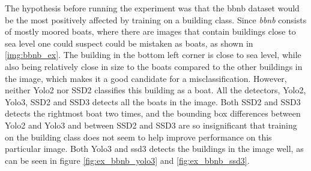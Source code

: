 The hypothesis before running the experiment was that the bbnb dataset would be the most positively affected by training on a building class. Since \textit{bbnb} consists of mostly moored boats, where there are images that contain buildings close to sea level one could suspect could be mistaken as boats, as shown in \ref{img:bbnb_ex}. The building in the bottom left corner is close to sea level, while also being relatively close in size to the boats compared to the other buildings in the image, which makes it a good candidate for a misclassification. However, neither Yolo2 nor SSD2 classifies this building as a boat. All the detectors, Yolo2, Yolo3, SSD2 and SSD3 detects all the boats in the image. Both SSD2 and SSD3 detects the rightmost boat two times, and the bounding box differences between Yolo2 and Yolo3 and between SSD2 and SSD3 are so insignificant that training on the building class does not seem to help improve performance on this particular image. Both Yolo3 and ssd3 detects the buildings in the image well, as can be seen in figure \ref{fig:ex_bbnb_yolo3} and \ref{fig:ex_bbnb_ssd3}.


